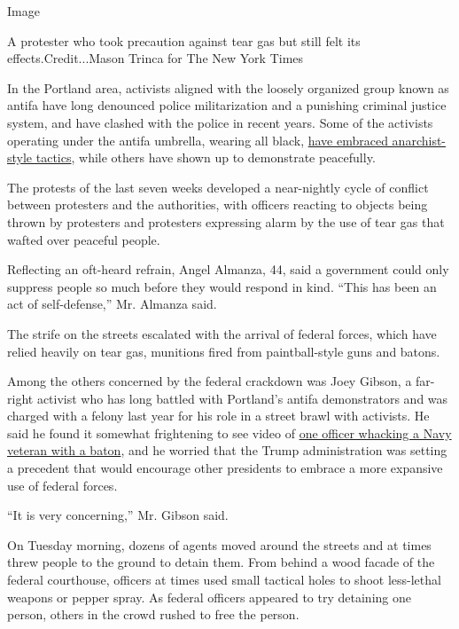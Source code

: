 Image

A protester who took precaution against tear gas but still felt its
effects.Credit...Mason Trinca for The New York Times

In the Portland area, activists aligned with the loosely organized group
known as antifa have long denounced police militarization and a
punishing criminal justice system, and have clashed with the police in
recent years. Some of the activists operating under the antifa umbrella,
wearing all black,
\href{https://www.nytimes3xbfgragh.onion/article/what-antifa-trump.html}{have
embraced anarchist-style tactics}, while others have shown up to
demonstrate peacefully.

The protests of the last seven weeks developed a near-nightly cycle of
conflict between protesters and the authorities, with officers reacting
to objects being thrown by protesters and protesters expressing alarm by
the use of tear gas that wafted over peaceful people.

Reflecting an oft-heard refrain, Angel Almanza, 44, said a government
could only suppress people so much before they would respond in kind.
``This has been an act of self-defense,'' Mr. Almanza said.

The strife on the streets escalated with the arrival of federal forces,
which have relied heavily on tear gas, munitions fired from
paintball-style guns and batons.

Among the others concerned by the federal crackdown was Joey Gibson, a
far-right activist who has long battled with Portland's antifa
demonstrators and was charged with a felony last year for his role in a
street brawl with activists. He said he found it somewhat frightening to
see video of
\href{https://www.nytimes3xbfgragh.onion/2020/07/20/us/portland-protests-navy-christopher-david.html}{one
officer whacking a Navy veteran with a baton}, and he worried that the
Trump administration was setting a precedent that would encourage other
presidents to embrace a more expansive use of federal forces.

``It is very concerning,'' Mr. Gibson said.

On Tuesday morning, dozens of agents moved around the streets and at
times threw people to the ground to detain them. From behind a wood
facade of the federal courthouse, officers at times used small tactical
holes to shoot less-lethal weapons or pepper spray. As federal officers
appeared to try detaining one person, others in the crowd rushed to free
the person.

